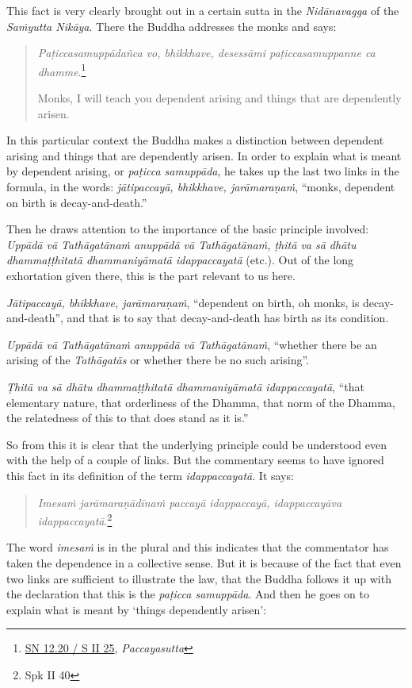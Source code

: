 This fact is very clearly brought out in a certain sutta in the \emph{Nidānavagga} of the \emph{Saṁyutta Nikāya}. There the Buddha addresses the monks and says:

\begin{quote}
\emph{Paṭiccasamuppādañca vo, bhikkhave, desessāmi paṭiccasamuppanne ca dhamme}.\footnote{\href{https://suttacentral.net/sn12.20/pli/ms}{SN 12.20 / S II 25}, \emph{Paccayasutta}}

Monks, I will teach you dependent arising and things that are dependently arisen.
\end{quote}

In this particular context the Buddha makes a distinction between dependent arising and things that are dependently arisen. In order to explain what is meant by dependent arising, or \emph{paṭicca samuppāda}, he takes up the last two links in the formula, in the words: \emph{jātipaccayā, bhikkhave, jarāmaraṇaṁ}, ``monks, dependent on birth is decay-and-death.''

Then he draws attention to the importance of the basic principle involved: \emph{Uppādā vā Tathāgatānaṁ anuppādā vā Tathāgatānaṁ, ṭhitā va sā dhātu dhammaṭṭhitatā dhammaniyāmatā idappaccayatā} (etc.). Out of the long exhortation given there, this is the part relevant to us here.

\emph{Jātipaccayā, bhikkhave, jarāmaraṇaṁ}, ``dependent on birth, oh monks, is decay-and-death'', and that is to say that decay-and-death has birth as its condition.

\emph{Uppādā vā Tathāgatānaṁ anuppādā vā Tathāgatānaṁ}, ``whether there be an arising of the \emph{Tathāgatās} or whether there be no such arising''.

\emph{Ṭhitā va sā dhātu dhammaṭṭhitatā dhammaniyāmatā idappaccayatā}, ``that elementary nature, that orderliness of the Dhamma, that norm of the Dhamma, the relatedness of this to that does stand as it is.''

So from this it is clear that the underlying principle could be understood even with the help of a couple of links. But the commentary seems to have ignored this fact in its definition of the term \emph{idappaccayatā}. It says:

\begin{quote}
\emph{Imesaṁ jarāmaraṇādīnaṁ paccayā idappaccayā, idappaccayāva idappaccayatā}.\footnote{Spk II 40}
\end{quote}

The word \emph{imesaṁ} is in the plural and this indicates that the commentator has taken the dependence in a collective sense. But it is because of the fact that even two links are sufficient to illustrate the law, that the Buddha follows it up with the declaration that this is the \emph{paṭicca samuppāda}. And then he goes on to explain what is meant by `things dependently arisen':

